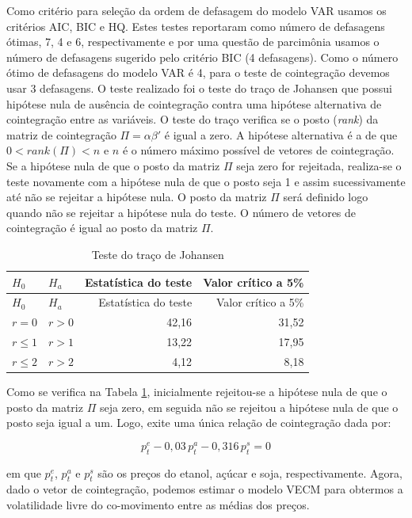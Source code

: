 Como critério para seleção da ordem de defasagem do modelo VAR usamos os
critérios AIC, BIC e HQ. Estes testes reportaram como número de
defasagens ótimas, 7, 4 e 6, respectivamente e por uma questão de
parcimônia usamos o número de defasagens sugerido pelo critério BIC (4
defasagens). Como o número ótimo de defasagens do modelo VAR é 4, para o
teste de cointegração devemos usar 3 defasagens. O teste realizado foi o
teste do traço de Johansen que possui hipótese nula de ausência de
cointegração contra uma hipótese alternativa de cointegração entre as
variáveis. O teste do traço verifica se o posto (\emph{rank}) da matriz
de cointegração \(\Pi = \alpha \beta'\) é igual a zero. A hipótese
alternativa é a de que \(0<rank(\Pi)<n\) e \(n\) é o número máximo
possível de vetores de cointegração. Se a hipótese nula de que o posto
da matriz \(\Pi\) seja zero for rejeitada, realiza-se o teste novamente
com a hipótese nula de que o posto seja 1 e assim sucessivamente até não
se rejeitar a hipótese nula. O posto da matriz \(\Pi\) será definido
logo quando não se rejeitar a hipótese nula do teste. O número de
vetores de cointegração é igual ao posto da matriz \(\Pi\).

\begin{longtable}[]{@{}llrr@{}}
\caption{\label{johansen}Teste do traço de Johansen}\tabularnewline
\toprule
\(H_0\) & \(H_a\) & Estatística do teste & Valor crítico a
5\%\tabularnewline
\midrule
\endfirsthead
\toprule
\(H_0\) & \(H_a\) & Estatística do teste & Valor crítico a
5\%\tabularnewline
\midrule
\endhead
\(r=0\) & \(r>0\) & 42,16 & 31,52\tabularnewline
\(r\leq 1\) & \(r>1\) & 13,22 & 17,95\tabularnewline
\(r\leq 2\) & \(r>2\) & 4,12 & 8,18\tabularnewline
\bottomrule
\end{longtable}

Como se verifica na Tabela \ref{johansen}, inicialmente rejeitou-se a hipótese nula
de que o posto da matriz \(\Pi\) seja zero, em seguida não se rejeitou a
hipótese nula de que o posto seja igual a um. Logo, exite uma única
relação de cointegração dada por:

\begin{equation}\label{coint}
p_t^e-0,03\,p_t^a-0,316\,p_t^s=0
\end{equation}

em que \(p_t^e\), \(p_t^a\) e \(p_t^s\) são os preços do etanol, açúcar
e soja, respectivamente. Agora, dado o vetor de cointegração, podemos
estimar o modelo VECM para obtermos a volatilidade livre do co-movimento
entre as médias dos preços.

